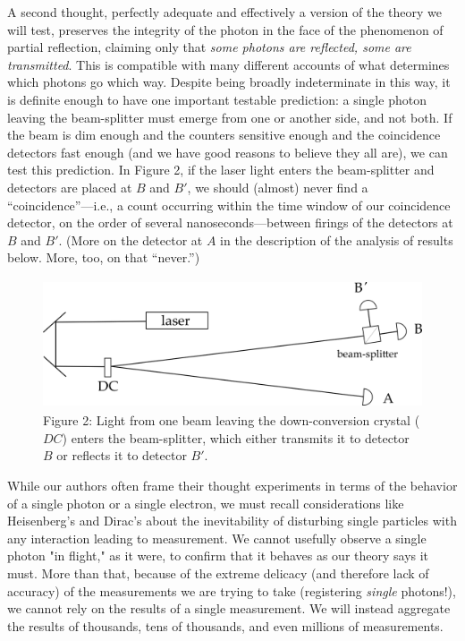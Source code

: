 A second thought, perfectly adequate and effectively a version of the theory we will test, preserves the integrity of the photon in the face of the phenomenon of partial reflection, claiming only that \emph{some photons are reflected, some are transmitted}. This is compatible with many different accounts of what determines which photons go which way. Despite being broadly indeterminate in this way, it is definite enough to have one important testable prediction: a single photon leaving the beam-splitter must emerge from one or another side, and not both. If the beam is dim enough and the counters sensitive enough and the coincidence detectors fast enough (and we have good reasons to believe they all are), we can test this prediction. In Figure 2, if the laser light enters the beam-splitter and detectors are placed at $B$ and $B'$, we should (almost) never find a ``coincidence''---i.e., a count occurring within the time window of our coincidence detector, on the order of several nanoseconds---between firings of the detectors at $B$ and $B'$. (More on the detector at $A$ in the description of the analysis of results below. More, too, on that ``never.'')


\begin{figure}[h] 
  \begin{center}
      \captionsetup{width=.75\textwidth}
    \includegraphics[width=4.58333in,height=1.49667in]{images/13_optics-lab/apparatus.png}
    \caption*{Figure 2: Light from one beam leaving the down-conversion crystal ($DC$) enters the beam-splitter, which either transmits it to detector $B$ or reflects it to detector $B'$.}
  \end{center}
\end{figure}



While our authors often frame their thought experiments in terms of the behavior of a single photon or a single electron, we must recall considerations like Heisenberg's and Dirac's about the inevitability of disturbing single particles with any interaction leading to measurement. We cannot usefully observe a single photon "in flight," as it were, to confirm that it behaves as our theory says it must. More than that, because of the extreme delicacy (and therefore lack of accuracy) of the measurements we are trying to take (registering \emph{single} photons!), we cannot rely on the results of a single measurement. We will instead aggregate the results of thousands, tens of thousands, and even millions of measurements.

